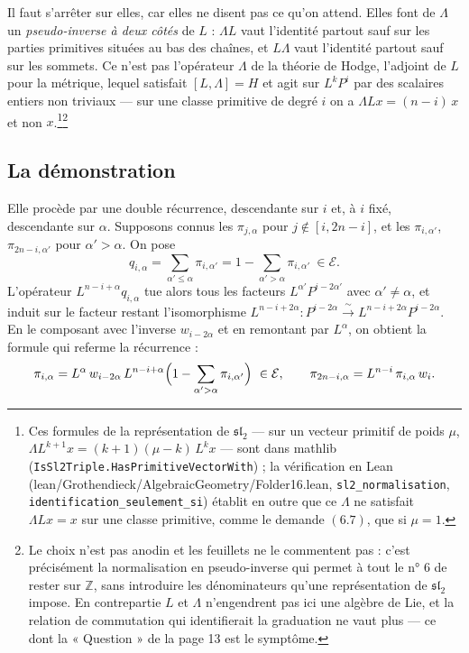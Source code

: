 \documentclass[11pt,a4paper]{article}
\begin{document}
Il faut s'arrêter sur elles, car elles ne disent pas ce qu'on attend. Elles
font de $\Lambda$ un \emph{pseudo-inverse à deux côtés} de $L$ : $\Lambda L$
vaut l'identité partout sauf sur les parties primitives situées au bas des
chaînes, et $L\Lambda$ vaut l'identité partout sauf sur les sommets. Ce n'est
pas l'opérateur $\Lambda$ de la théorie de Hodge, l'adjoint de $L$ pour la
métrique, lequel satisfait $[L,\Lambda] = H$ et agit sur $L^{k}P^{i}$ par des
scalaires entiers non triviaux --- sur une classe primitive de degré $i$ on a
$\Lambda L x = (n-i)\,x$ et non $x$.\footnote{Ces formules de la
représentation de $\mathfrak{sl}_{2}$ --- sur un vecteur primitif de poids
$\mu$, $\Lambda L^{k+1}x = (k+1)(\mu-k)\,L^{k}x$ --- sont dans mathlib
(\texttt{IsSl2Triple.HasPrimitiveVectorWith}) ; la vérification en Lean
(lean/Grothendieck/AlgebraicGeometry/Folder16.lean, \texttt{sl2\_normalisation},
\texttt{identification\_seulement\_si}) établit en outre que ce $\Lambda$ ne
satisfait $\Lambda L x = x$ sur une classe primitive, comme le demande
$(6.7)$, que si $\mu = 1$.}\footnote{Le choix n'est pas anodin et les
feuillets ne le commentent pas : c'est précisément la normalisation en
pseudo-inverse qui permet à tout le n° 6 de rester sur $\mathbb{Z}$, sans
introduire les dénominateurs qu'une représentation de $\mathfrak{sl}_{2}$
impose. En contrepartie $L$ et $\Lambda$ n'engendrent pas ici une algèbre de
Lie, et la relation de commutation qui identifierait la graduation ne vaut
plus --- ce dont la « Question » de la page 13 est le symptôme.}

\subsection*{La démonstration}

Elle procède par une double récurrence, descendante sur $i$ et, à $i$ fixé,
descendante sur $\alpha$. Supposons connus les $\pi_{j,\alpha}$ pour
$j \notin [i, 2n-i]$, et les $\pi_{i,\alpha'}$, $\pi_{2n-i,\alpha'}$ pour
$\alpha' > \alpha$. On pose
\[
q_{i,\alpha} = \sum_{\alpha' \leqslant \alpha} \pi_{i,\alpha'}
= 1 - \sum_{\alpha' > \alpha} \pi_{i,\alpha'} \ \in \mathcal{E} .
\]
L'opérateur $L^{n-i+\alpha}q_{i,\alpha}$ tue alors tous les facteurs
$L^{\alpha'}P^{i-2\alpha'}$ avec $\alpha' \neq \alpha$, et induit sur le
facteur restant l'isomorphisme
$L^{n-i+2\alpha} \colon P^{i-2\alpha} \xrightarrow{\ \sim\ }
L^{n-i+2\alpha}P^{i-2\alpha}$. En le composant avec l'inverse $w_{i-2\alpha}$
et en remontant par $L^{\alpha}$, on obtient la formule qui referme la
récurrence :
\[
\pi_{i,\alpha}
= L^{\alpha}\,w_{i-2\alpha}\,L^{n-i+\alpha}
  \Bigl( 1 - \sum_{\alpha' > \alpha} \pi_{i,\alpha'} \Bigr) \ \in \mathcal{E},
\qquad
\pi_{2n-i,\alpha} = L^{n-i}\,\pi_{i,\alpha}\,w_{i} .
\]
\end{document}
